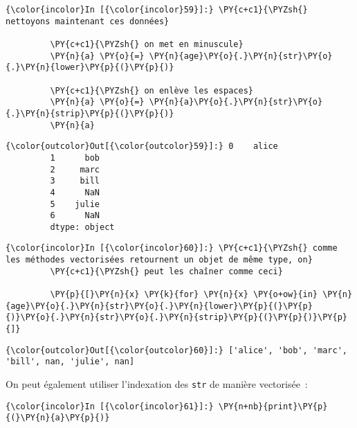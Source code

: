    \begin{Verbatim}[commandchars=\\\{\},frame=single,framerule=0.3mm,rulecolor=\color{cellframecolor}]
{\color{incolor}In [{\color{incolor}59}]:} \PY{c+c1}{\PYZsh{} nettoyons maintenant ces données}
         
         \PY{c+c1}{\PYZsh{} on met en minuscule}
         \PY{n}{a} \PY{o}{=} \PY{n}{age}\PY{o}{.}\PY{n}{str}\PY{o}{.}\PY{n}{lower}\PY{p}{(}\PY{p}{)}
         
         \PY{c+c1}{\PYZsh{} on enlève les espaces}
         \PY{n}{a} \PY{o}{=} \PY{n}{a}\PY{o}{.}\PY{n}{str}\PY{o}{.}\PY{n}{strip}\PY{p}{(}\PY{p}{)}
         \PY{n}{a}
\end{Verbatim}


\begin{Verbatim}[commandchars=\\\{\},frame=single,framerule=0.3mm,rulecolor=\color{cellframecolor}]
{\color{outcolor}Out[{\color{outcolor}59}]:} 0    alice
         1      bob
         2     marc
         3     bill
         4      NaN
         5    julie
         6      NaN
         dtype: object
\end{Verbatim}
            
    \begin{Verbatim}[commandchars=\\\{\},frame=single,framerule=0.3mm,rulecolor=\color{cellframecolor}]
{\color{incolor}In [{\color{incolor}60}]:} \PY{c+c1}{\PYZsh{} comme les méthodes vectorisées retournent un objet de même type, on}
         \PY{c+c1}{\PYZsh{} peut les chaîner comme ceci}
         
         \PY{p}{[}\PY{n}{x} \PY{k}{for} \PY{n}{x} \PY{o+ow}{in} \PY{n}{age}\PY{o}{.}\PY{n}{str}\PY{o}{.}\PY{n}{lower}\PY{p}{(}\PY{p}{)}\PY{o}{.}\PY{n}{str}\PY{o}{.}\PY{n}{strip}\PY{p}{(}\PY{p}{)}\PY{p}{]}
\end{Verbatim}


\begin{Verbatim}[commandchars=\\\{\},frame=single,framerule=0.3mm,rulecolor=\color{cellframecolor}]
{\color{outcolor}Out[{\color{outcolor}60}]:} ['alice', 'bob', 'marc', 'bill', nan, 'julie', nan]
\end{Verbatim}
            
    On peut également utiliser l'indexation des \texttt{str} de manière
vectorisée~:

    \begin{Verbatim}[commandchars=\\\{\},frame=single,framerule=0.3mm,rulecolor=\color{cellframecolor}]
{\color{incolor}In [{\color{incolor}61}]:} \PY{n+nb}{print}\PY{p}{(}\PY{n}{a}\PY{p}{)}
\end{Verbatim}


